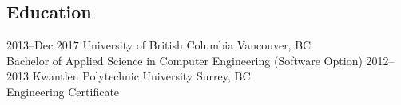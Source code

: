 \documentclass[]{friggeri-cv} %
\begin{document}
\begin{entrylist}

\section{Education}

\entry
{2013--Dec 2017}
{University of British Columbia {\normalfont Vancouver, BC}}
{\\Bachelor of Applied Science in Computer Engineering (Software Option)}
\entry
{2012--2013}
  {Kwantlen Polytechnic University {\normalfont Surrey, BC}} %
{\\Engineering Certificate}
\end{entrylist}




\end{document}
